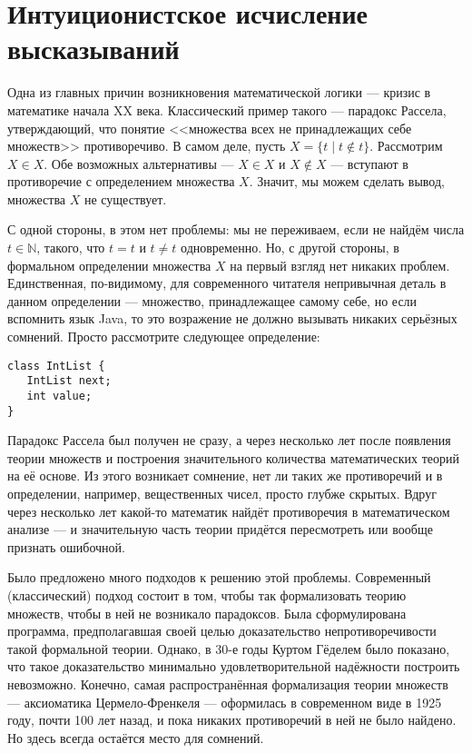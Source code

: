\section{Интуиционистское исчисление высказываний}

Одна из главных причин возникновения математической логики --- кризис в математике
начала XX века. Классический пример такого --- парадокс Рассела, утверждающий,
что понятие <<множества всех не принадлежащих себе множеств>> противоречиво.
В самом деле, пусть $X = \{ t \mid t \notin t \}$. Рассмотрим $X \in X$.
Обе возможных альтернативы --- $X \in X$ и $X \notin X$ --- вступают в противоречие с 
определением множества $X$. Значит, мы можем сделать вывод, множества $X$ не существует.

С одной стороны, в этом нет проблемы: мы не переживаем, если не найдём числа $t \in \mathbb{N}$, 
такого, что $t=t$ и $t \ne t$ одновременно. Но, с другой стороны, в формальном определении
множества $X$ на первый взгляд нет никаких проблем. Единственная, по-видимому, для современного
читателя непривычная деталь в данном определении --- множество, принадлежащее самому себе, но 
если вспомнить язык Java, то это возражение не должно вызывать никаких серьёзных сомнений.
Просто рассмотрите следующее определение:

\begin{verbatim}
class IntList {
   IntList next;
   int value;
}
\end{verbatim}

Парадокс Рассела был получен не сразу,
а через несколько лет после появления теории множеств и построения значительного количества
математических теорий на её основе. Из этого возникает сомнение, нет ли таких 
же противоречий и в определении, например, вещественных чисел, просто глубже скрытых.
Вдруг через несколько лет какой-то математик найдёт противоречия в математическом анализе --- 
и значительную часть теории придётся пересмотреть или вообще признать ошибочной.

Было предложено много подходов к решению этой проблемы. Современный (классический) подход 
состоит в том, чтобы так формализовать теорию множеств, чтобы в ней не возникало парадоксов.
Была сформулирована программа, предполагавшая своей целью доказательство непротиворечивости
такой формальной теории. Однако, в 30-е годы Куртом Гёделем было показано, что такое 
доказательство минимально удовлетворительной надёжности построить невозможно. Конечно,
самая распространённая формализация теории множеств --- аксиоматика Цермело-Френкеля ---
оформилась в современном виде в 1925 году, почти 100 лет назад, и пока никаких противоречий
в ней не было найдено. Но здесь всегда остаётся место для сомнений.

